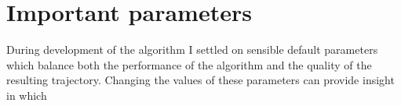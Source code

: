 \section{Important parameters}
During development of the algorithm I settled on sensible default parameters which balance both the performance of the algorithm and the quality of the resulting trajectory. Changing the values of these parameters can provide insight in which
%






